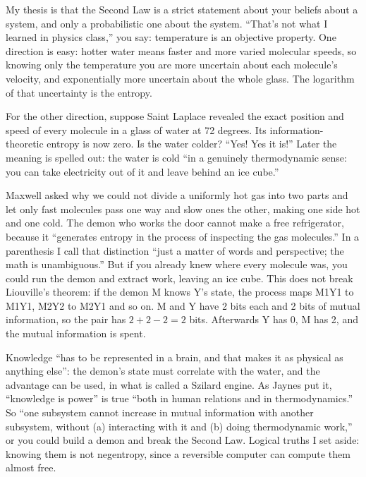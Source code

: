 My thesis is that the Second Law is a strict statement about your beliefs about a system, and only a probabilistic one about the system. ``That's not what I learned in physics class,'' you say: temperature is an objective property. One direction is easy: hotter water means faster and more varied molecular speeds, so knowing only the temperature you are more uncertain about each molecule's velocity, and exponentially more uncertain about the whole glass. The logarithm of that uncertainty is the entropy.

For the other direction, suppose Saint Laplace revealed the exact position and speed of every molecule in a glass of water at 72 degrees. Its information-theoretic entropy is now zero. Is the water colder? ``Yes! Yes it is!''  Later the meaning is spelled out: the water is cold ``in a genuinely thermodynamic sense: you can take electricity out of it and leave behind an ice cube.'' 

Maxwell asked why we could not divide a uniformly hot gas into two parts and let only fast molecules pass one way and slow ones the other, making one side hot and one cold. The demon who works the door cannot make a free refrigerator, because it ``generates entropy in the process of inspecting the gas molecules.''  In a parenthesis I call that distinction ``just a matter of words and perspective; the math is unambiguous.''  But if you already knew where every molecule was, you could run the demon and extract work, leaving an ice cube. This does not break Liouville's theorem: if the demon M knows Y's state, the process maps M1Y1 to M1Y1, M2Y2 to M2Y1 and so on. M and Y have 2 bits each and 2 bits of mutual information, so the pair has $2 + 2 - 2 = 2$ bits. Afterwards Y has 0, M has 2, and the mutual information is spent.

Knowledge ``has to be represented in a brain, and that makes it as physical as anything else'': the demon's state must correlate with the water, and the advantage can be used, in what is called a Szilard engine. As Jaynes put it, ``knowledge is power'' is true ``both in human relations and in thermodynamics.'' So ``one subsystem cannot increase in mutual information with another subsystem, without (a) interacting with it and (b) doing thermodynamic work,'' or you could build a demon and break the Second Law. Logical truths I set aside: knowing them is not negentropy, since a reversible computer can compute them almost free.

